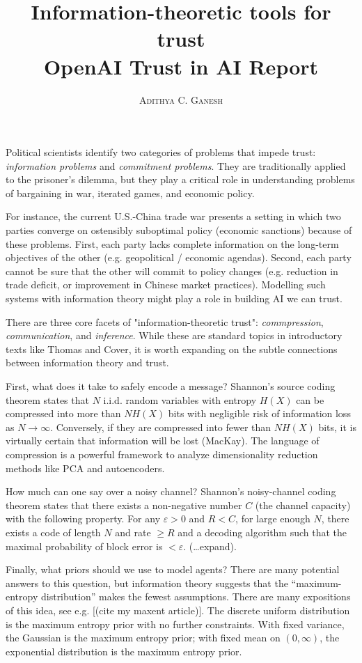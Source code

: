 \documentclass[11pt]{article}
\title{Information-theoretic tools for trust \\ \vspace{0.3cm} OpenAI Trust in AI Report}
\author{\textsc{Adithya C. Ganesh}}
\begin{document}
\maketitle

\noindent Political scientists identify two categories of problems that impede trust: {\it information problems} and {\it commitment problems}.  They are traditionally applied to the prisoner's dilemma, but they play a critical role in understanding problems of bargaining in war, iterated games, and economic policy.  

For instance, the current U.S.-China trade war presents a setting in which two parties converge on ostensibly suboptimal policy (economic sanctions) because of these problems.  First, each party lacks complete information on the long-term objectives of the other (e.g. geopolitical / economic agendas).  Second, each party cannot be sure that the other will commit to policy changes (e.g. reduction in trade deficit, or improvement in Chinese market practices).  Modelling such systems with information theory might play a role in building AI we can trust.

There are three core facets of "information-theoretic trust": {\it commpression}, {\it communication}, and {\it inference}.  While these are standard topics in introductory texts like Thomas and Cover, it is worth expanding on the subtle connections between information theory and trust.

First, what does it take to safely encode a message?  Shannon's source coding theorem states that $N$ i.i.d. random variables with entropy $H(X)$ can be compressed into more than $N H(X)$ bits with negligible risk of information loss as $N \to \infty$.  Conversely, if they are compressed into fewer than $N H(X)$ bits, it is virtually certain that information will be lost (MacKay).  The language of compression is a powerful framework to analyze dimensionality reduction methods like PCA and autoencoders.

How much can one say over a noisy channel?  Shannon's noisy-channel coding theorem states that there exists a non-negative number $C$ (the channel capacity) with the following property.  For any $\varepsilon > 0$ and $R < C$, for large enough $N$, there exists a code of length $N$ and rate $\geq R$ and a decoding algorithm such that the maximal probability of block error is $< \varepsilon$.  (\dots expand). 

Finally, what priors should we use to model agents?  There are many potential answers to this question, but information theory suggests that the ``maximum-entropy distribution'' makes the fewest assumptions.  There are many expositions of this idea, see e.g. [(cite my maxent article)].  The discrete uniform distribution is the maximum entropy prior with no further constraints.  With fixed variance, the Gaussian is the maximum entropy prior; with fixed mean on $(0, \infty)$, the exponential distribution is the maximum entropy prior.
\end{document}
